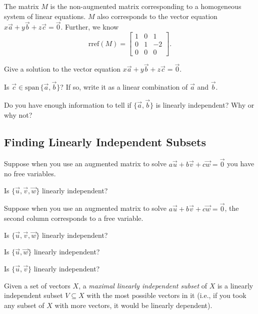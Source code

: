 \documentclass{problemset}
\newcommand{\Span}{\mathrm{span}\,}
\newcommand{\rref}{\mathrm{rref}}
\newcommand{\mat}[1]{\begin{bmatrix}#1\end{bmatrix}}
\begin{document}
	The matrix $M$ is the non-augmented matrix corresponding to a homogeneous system of linear equations.
	$M$ also corresponds to the vector equation $x\vec a+y\vec b+z\vec c=\vec 0$.  Further, we know
	\[
		\rref(M) = \mat{1&0&1\\0&1&-2\\0&0&0}.
	\]
	\begin{parts}[resume]
		\item Give a solution to the vector equation $x\vec a+y\vec b+z\vec c=\vec 0$.
		\item Is $\vec c\in\Span\{\vec a,\vec b\}$?  If so, write it as a linear combination
			of $\vec a$ and $\vec b$.
		\item Do you have enough information to tell if $\{\vec a,\vec b\}$ is linearly independent?  Why or why not?
	\end{parts}

\subsection*{Finding Linearly Independent Subsets}
	\question
	Suppose when you use an augmented matrix to solve
	$a\vec u+b\vec v+c\vec w=\vec 0$ you have no free variables.
	
	\begin{parts}
		\item Is $\{\vec u,\vec v,\vec w\}$ linearly independent?
	\end{parts}
	
	Suppose when you use an augmented matrix to solve
	$a\vec u+b\vec v+c\vec w=\vec 0$, the second column corresponds to a 
	free variable.
	
	\begin{parts}[resume]
		\item Is $\{\vec u,\vec v,\vec w\}$ linearly independent?
		\item Is $\{\vec u,\vec w\}$ linearly independent?
		\item Is $\{\vec u,\vec v\}$ linearly independent?
	\end{parts}

	\begin{definition}
	Given a set of vectors $X$, a 
	\emph{maximal linearly independent subset} of $X$ is a linearly independent
	subset $V\subseteq X$ with the most possible vectors in it 
	(i.e., if you took any subset of $X$ with more vectors, it would be linearly
	dependent).
	\end{definition}
\end{document}
